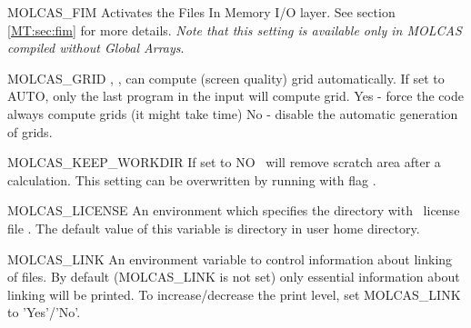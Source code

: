 \begin{variablelist}
\item[MOLCAS\_FIM]
Activates the Files In Memory I/O layer. See section \ref{MT:sec:fim} for more details.
{\it Note that this setting is available only in MOLCAS compiled without Global
Arrays}.

\item[MOLCAS\_GRID]
, ,  can compute (screen quality) grid automatically.
If set to AUTO, only the last program in the input will compute grid.
Yes - force the code always compute grids (it might take time)
No - disable the automatic generation of grids.
\item[MOLCAS\_KEEP\_WORKDIR]
If set to NO \molcas\ will remove scratch area after a calculation.
This setting can be overwritten by running  with flag .

\item[MOLCAS\_LICENSE]
An environment which specifies the directory with \molcas\ license file .
The default value of this variable is directory  in user home directory.
\item[MOLCAS\_LINK]
An environment variable to control information about linking of files.
By default (MOLCAS\_LINK is not set) only essential
information about linking will be printed. To increase/decrease the
print level, set MOLCAS\_LINK to 'Yes'/'No'.


\end{variablelist}
